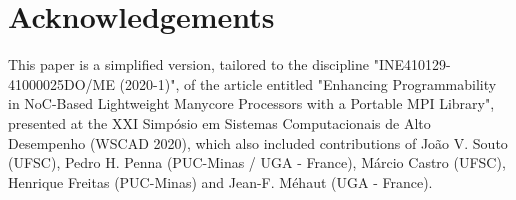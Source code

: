 \section*{Acknowledgements}

	This paper is a simplified version, tailored to the discipline
	"INE410129-41000025DO/ME (2020-1)", of the article entitled "Enhancing Programmability in
	NoC-Based Lightweight Manycore Processors with a Portable MPI Library", presented
	at the XXI Simpósio em Sistemas Computacionais de Alto Desempenho (WSCAD 2020), which also included
	contributions of João V. Souto (UFSC), Pedro H. Penna (PUC-Minas / UGA - France),
	Márcio Castro (UFSC), Henrique Freitas (PUC-Minas) and Jean-F. Méhaut (UGA - France).
